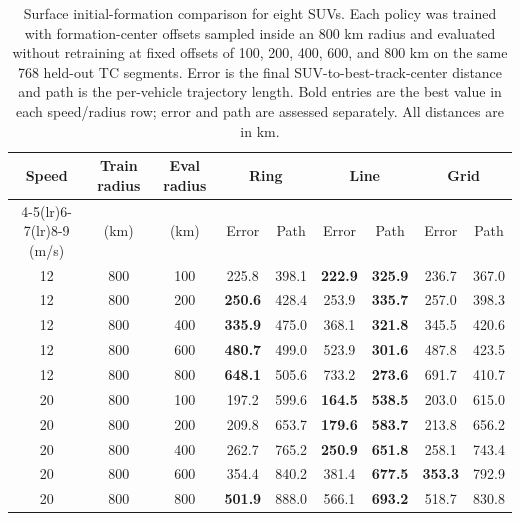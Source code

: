 \begin{table}[t]
\centering
\caption{Surface initial-formation comparison for eight SUVs. Each policy was trained with formation-center offsets sampled inside an 800 km radius and evaluated without retraining at fixed offsets of 100, 200, 400, 600, and 800 km on the same 768 held-out TC segments. Error is the final SUV-to-best-track-center distance and path is the per-vehicle trajectory length. Bold entries are the best value in each speed/radius row; error and path are assessed separately. All distances are in km.}
\label{tab:formation_comparison}
\small
\setlength{\tabcolsep}{2.7pt}
\begin{tabular*}{\textwidth}{@{\extracolsep{\fill}}ccccccccc@{}}
\toprule
Speed & Train radius & Eval radius & \multicolumn{2}{c}{Ring} & \multicolumn{2}{c}{Line} & \multicolumn{2}{c}{Grid} \\
\cmidrule(lr){4-5}\cmidrule(lr){6-7}\cmidrule(lr){8-9}
(m/s) & (km) & (km) & Error & Path & Error & Path & Error & Path \\
\midrule
12 & 800 & 100 & 225.8 & 398.1 & \textbf{222.9} & \textbf{325.9} & 236.7 & 367.0 \\
12 & 800 & 200 & \textbf{250.6} & 428.4 & 253.9 & \textbf{335.7} & 257.0 & 398.3 \\
12 & 800 & 400 & \textbf{335.9} & 475.0 & 368.1 & \textbf{321.8} & 345.5 & 420.6 \\
12 & 800 & 600 & \textbf{480.7} & 499.0 & 523.9 & \textbf{301.6} & 487.8 & 423.5 \\
12 & 800 & 800 & \textbf{648.1} & 505.6 & 733.2 & \textbf{273.6} & 691.7 & 410.7 \\
\midrule
20 & 800 & 100 & 197.2 & 599.6 & \textbf{164.5} & \textbf{538.5} & 203.0 & 615.0 \\
20 & 800 & 200 & 209.8 & 653.7 & \textbf{179.6} & \textbf{583.7} & 213.8 & 656.2 \\
20 & 800 & 400 & 262.7 & 765.2 & \textbf{250.9} & \textbf{651.8} & 258.1 & 743.4 \\
20 & 800 & 600 & 354.4 & 840.2 & 381.4 & \textbf{677.5} & \textbf{353.3} & 792.9 \\
20 & 800 & 800 & \textbf{501.9} & 888.0 & 566.1 & \textbf{693.2} & 518.7 & 830.8 \\
\bottomrule
\end{tabular*}
\end{table}
